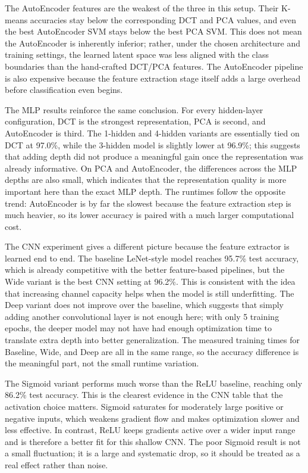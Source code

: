 The AutoEncoder features are the weakest of the three in this setup. Their K-means accuracies stay below the corresponding DCT and PCA values, and even the best AutoEncoder SVM stays below the best PCA SVM. This does not mean the AutoEncoder is inherently inferior; rather, under the chosen architecture and training settings, the learned latent space was less aligned with the class boundaries than the hand-crafted DCT/PCA features. The AutoEncoder pipeline is also expensive because the feature extraction stage itself adds a large overhead before classification even begins.

The MLP results reinforce the same conclusion. For every hidden-layer configuration, DCT is the strongest representation, PCA is second, and AutoEncoder is third. The 1-hidden and 4-hidden variants are essentially tied on DCT at 97.0\%, while the 3-hidden model is slightly lower at 96.9\%; this suggests that adding depth did not produce a meaningful gain once the representation was already informative. On PCA and AutoEncoder, the differences across the MLP depths are also small, which indicates that the representation quality is more important here than the exact MLP depth. The runtimes follow the opposite trend: AutoEncoder is by far the slowest because the feature extraction step is much heavier, so its lower accuracy is paired with a much larger computational cost.

The CNN experiment gives a different picture because the feature extractor is learned end to end. The baseline LeNet-style model reaches 95.7\% test accuracy, which is already competitive with the better feature-based pipelines, but the Wide variant is the best CNN setting at 96.2\%. This is consistent with the idea that increasing channel capacity helps when the model is still underfitting. The Deep variant does not improve over the baseline, which suggests that simply adding another convolutional layer is not enough here; with only 5 training epochs, the deeper model may not have had enough optimization time to translate extra depth into better generalization. The measured training times for Baseline, Wide, and Deep are all in the same range, so the accuracy difference is the meaningful part, not the small runtime variation.

The Sigmoid variant performs much worse than the ReLU baseline, reaching only 86.2\% test accuracy. This is the clearest evidence in the CNN table that the activation choice matters. Sigmoid saturates for moderately large positive or negative inputs, which weakens gradient flow and makes optimization slower and less effective. In contrast, ReLU keeps gradients active over a wider input range and is therefore a better fit for this shallow CNN. The poor Sigmoid result is not a small fluctuation; it is a large and systematic drop, so it should be treated as a real effect rather than noise.

